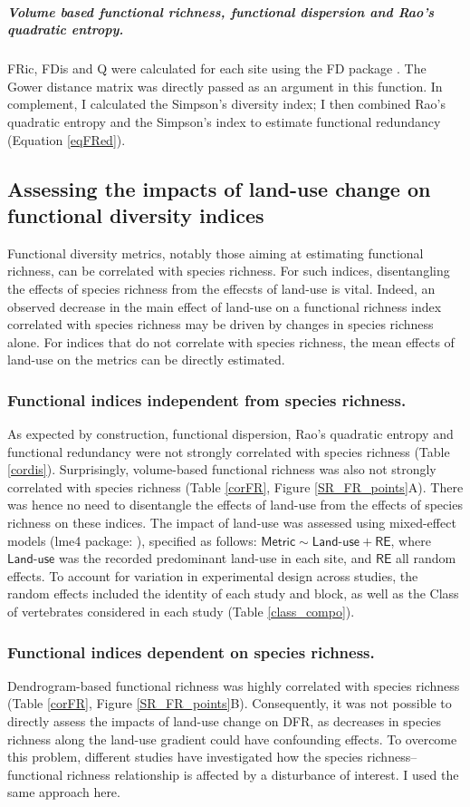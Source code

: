 \subparagraph{Volume based functional richness, functional dispersion and Rao's quadratic entropy.} FRic, FDis and Q were calculated for each site using the FD package \citep{Laliberte2015}. The Gower distance matrix was directly passed as an argument in this function. In complement, I calculated the Simpson's diversity index; I then combined Rao's quadratic entropy and the Simpson's index to estimate functional redundancy (Equation \ref{eqFRed}). 

\subsection{Assessing the impacts of land-use change on functional diversity indices}

Functional diversity metrics, notably those aiming at estimating functional richness, can be correlated with species richness. For such indices, disentangling the effects of species richness from the effecsts of land-use is vital. Indeed, an observed decrease in the main effect of land-use on a functional richness index correlated with species richness may be driven by changes in species richness alone. For indices that do not correlate with species richness, the mean effects of land-use on the metrics can be directly estimated.

	\subsubsection{Functional indices independent from species richness.}
As expected by construction, functional dispersion, Rao's quadratic entropy and functional redundancy were not strongly correlated with species richness (Table \ref{cordis}). Surprisingly, volume-based functional richness was also not strongly correlated with species richness (Table \ref{corFR}, Figure \ref{SR_FR_points}A). There was hence no need to disentangle the effects of land-use from the effects of species richness on these indices. The impact of land-use was assessed using mixed-effect models (lme4 package: \citet{lme4}), specified as follows: $\textsf{Metric} \sim \textsf{Land-use} + \textsf{RE}$, where $\textsf{Land-use}$ was the recorded predominant land-use in each site, and $\textsf{RE}$ all random effects. To account for variation in experimental design across studies, the random effects included the identity of each study and block, as well as the Class of vertebrates considered in each study (Table \ref{class_compo}).

	\subsubsection{Functional indices dependent on species richness.}
Dendrogram-based functional richness was highly correlated with species richness (Table \ref{corFR}, Figure \ref{SR_FR_points}B). Consequently, it was not possible to directly assess the impacts of land-use change on DFR, as decreases in species richness along the land-use gradient could have confounding effects. To overcome this problem, different studies have investigated how the species richness--functional richness relationship is affected by a disturbance of interest. I used the same approach here.

